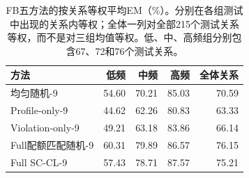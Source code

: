 \begin{table}[htbp]
\caption{FB五方法的按关系等权平均EM（\%）。分别在各组测试中出现的关系内等权；全体一列对全部215个测试关系等权，而不是对三组均值等权。低、中、高频组分别包含67、72和76个测试关系。}
\label{tab:fb-macro}
\centering\small
\begin{tabular}{lrrrr}
\toprule
方法 & 低频 & 中频 & 高频 & 全体关系 \\
\midrule
均匀随机-9 & 54.60 & 70.21 & 85.03 & 70.59 \\
Profile-only-9 & 44.62 & 62.26 & 80.83 & 63.33 \\
Violation-only-9 & 49.21 & 63.18 & 83.86 & 66.14 \\
Full配额匹配随机-9 & 60.31 & 79.89 & 86.57 & 76.15 \\
Full SC-CL-9 & 57.43 & 78.71 & 87.57 & 75.21 \\
\bottomrule
\end{tabular}
\end{table}

